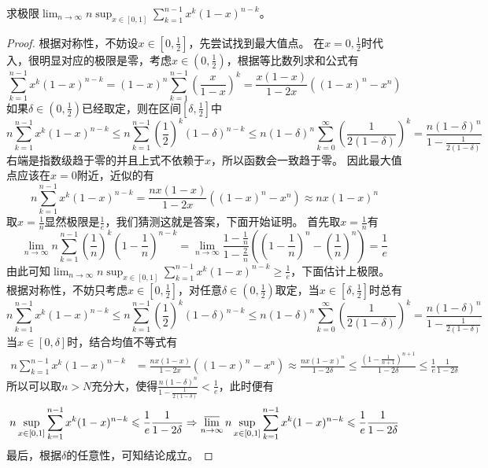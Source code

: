 \documentclass[../../main.tex]{subfiles}
\begin{document}
\begin{example}
求极限\(\lim_{n\rightarrow\infty}n\sup_{x\in[0,1]}\sum_{k = 1}^{n - 1}x^{k}(1 - x)^{n - k}\)。
\end{example}
\begin{proof}
根据对称性，不妨设\(x\in\left[0,\frac{1}{2}\right]\)，先尝试找到最大值点。
在\(x = 0,\frac{1}{2}\)时代入，很明显对应的极限是零，考虑\(x\in\left(0,\frac{1}{2}\right)\)，根据等比数列求和公式有
\[
\sum_{k = 1}^{n - 1}x^{k}(1 - x)^{n - k}=(1 - x)^{n}\sum_{k = 1}^{n - 1}\left(\frac{x}{1 - x}\right)^{k}=\frac{x(1 - x)}{1 - 2x}((1 - x)^{n}-x^{n})
\]
如果\(\delta\in\left(0,\frac{1}{2}\right)\)已经取定，则在区间\(\left[\delta,\frac{1}{2}\right]\)中
\[
n\sum_{k = 1}^{n - 1}x^{k}(1 - x)^{n - k}\leqslant  n\sum_{k = 1}^{n - 1}\left(\frac{1}{2}\right)^{k}(1 - \delta)^{n - k}\leqslant  n(1 - \delta)^{n}\sum_{k = 0}^{\infty}\left(\frac{1}{2(1 - \delta)}\right)^{k}=\frac{n(1 - \delta)^{n}}{1-\frac{1}{2(1 - \delta)}}
\]
右端是指数级趋于零的并且上式不依赖于\(x\)，所以函数会一致趋于零。
因此最大值点应该在\(x = 0\)附近，近似的有
\[
n\sum_{k = 1}^{n - 1}x^{k}(1 - x)^{n - k}=\frac{nx(1 - x)}{1 - 2x}((1 - x)^{n}-x^{n})\approx nx(1 - x)^{n}
\]
取\(x = \frac{1}{n}\)显然极限是\(\frac{1}{e}\)，我们猜测这就是答案，下面开始证明。
首先取\(x = \frac{1}{n}\)有
\[
\lim_{n\rightarrow\infty}n\sum_{k = 1}^{n - 1}\left(\frac{1}{n}\right)^{k}\left(1-\frac{1}{n}\right)^{n - k}=\lim_{n\rightarrow\infty}\frac{1-\frac{1}{n}}{1-\frac{2}{n}}\left(\left(1-\frac{1}{n}\right)^{n}-\left(\frac{1}{n}\right)^{n}\right)=\frac{1}{e}
\]
由此可知\(\lim_{n\rightarrow\infty}n\sup_{x\in[0,1]}\sum_{k = 1}^{n - 1}x^{k}(1 - x)^{n - k}\geqslant \frac{1}{e}\)，下面估计上极限。
根据对称性，不妨只考虑\(x\in\left[0,\frac{1}{2}\right]\)，对任意\(\delta\in\left(0,\frac{1}{2}\right)\)取定，当\(x\in\left[\delta,\frac{1}{2}\right]\)时总有
\[
n\sum_{k = 1}^{n - 1}x^{k}(1 - x)^{n - k}\leqslant  n\sum_{k = 1}^{n - 1}\left(\frac{1}{2}\right)^{k}(1 - \delta)^{n - k}\leqslant  n(1 - \delta)^{n}\sum_{k = 0}^{\infty}\left(\frac{1}{2(1 - \delta)}\right)^{k}=\frac{n(1 - \delta)^{n}}{1-\frac{1}{2(1 - \delta)}}
\]
当\(x\in[0,\delta]\)时，结合均值不等式有
\begin{align*}
n\sum_{k = 1}^{n - 1}x^{k}(1 - x)^{n - k}&=\frac{nx(1 - x)}{1 - 2x}((1 - x)^{n}-x^{n})\approx\frac{nx(1 - x)^{n}}{1 - 2\delta}\leqslant \frac{\left(1-\frac{1}{n + 1}\right)^{n + 1}}{1 - 2\delta}\leqslant \frac{1}{e}\frac{1}{1 - 2\delta}
\end{align*}
所以可以取\(n > N\)充分大，使得\(\frac{n(1 - \delta)^{n}}{1-\frac{1}{2(1 - \delta)}}<\frac{1}{e}\)，此时便有
\[
n\sup_{x\in[0,1]}\sum_{k = 1}^{n - 1}x^{k}(1 - x)^{n - k}\leqslant \frac{1}{e}\frac{1}{1 - 2\delta}\Rightarrow\varlimsup_{n\rightarrow\infty}n\sup_{x\in[0,1]}\sum_{k = 1}^{n - 1}x^{k}(1 - x)^{n - k}\leqslant \frac{1}{e}\frac{1}{1 - 2\delta}
\]
最后，根据\(\delta\)的任意性，可知结论成立。

\end{proof}
\end{document}

